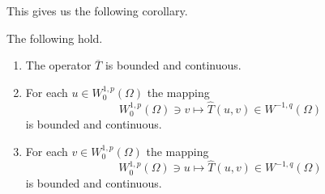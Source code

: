 This gives us the following corollary.

\begin{Corollary}
\label{cor:cv-pde-partial-argument-continuity}
The following hold.\begin{enumerate}\item The operator $\overline T$ is bounded and continuous.\item For each $u\in W_0^{1,p}(\Omega)$ the mapping
\begin{equation}\label{eq:cv-pde-two-argument-second-variable-continuity}
W_0^{1,p}(\Omega)\ni v\mapsto\widehat T(u,v)\in W^{-1,q}(\Omega)
\end{equation}
is bounded and continuous.\item For each $v\in W_0^{1,p}(\Omega)$ the mapping
\begin{equation}\label{eq:cv-pde-two-argument-first-variable-continuity}
W_0^{1,p}(\Omega)\ni u\mapsto\widehat T(u,v)\in W^{-1,q}(\Omega)
\end{equation}
is bounded and continuous.\end{enumerate}
\end{Corollary}

